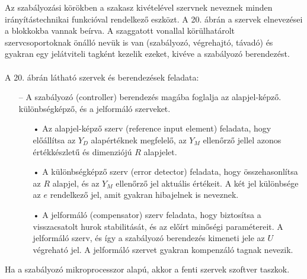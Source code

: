 \documentclass[11pt,a4paper]{article}
\begin{document}
Az szabályozási körökben a szakasz kivételével szervnek neveznek minden
irányítástechnikai funkcióval rendelkező eszközt. A 20. ábrán a szervek elnevezései a
blokkokba vannak beírva. A szaggatott vonallal körülhatárolt szervcsoportoknak önálló
nevük is van (szabályozó, végrehajtó, távadó) és gyakran egy jelátviteli tagként kezelik
ezeket, kivéve a szabályozó berendezést.
\\\\
A 20. ábrán látható szervek és berendezések feladata:
\begin{enumerate}
	\item[--] A szabályozó (controller) berendezés magába foglalja az alapjel-képző. különbségképző,
és a jelformáló szerveket.
	\begin{itemize}
		\item[•]Az alapjel-képző szerv (reference input element) feladata, hogy előállítsa az $Y_D$
alapértéknek megfelelő, az $Y_M$ ellenőrző jellel azonos értékkészletű és dimenziójú $R$ alapjelet.
\item[•]A különbségképző szerv (error detector) feladata, hogy összehasonlítsa az $R$
alapjel, és az $Y_M$ ellenőrző jel aktuális értékeit. A két jel különbsége az $e$ rendelkező
jel, amit gyakran hibajelnek is neveznek.
\item[•]A jelformáló (compensator) szerv feladata, hogy biztosítsa a visszacsatolt hurok
stabilitását, és az előírt minőségi paramétereit. A jelformáló szerv, és így a szabályozó
berendezés kimeneti jele az $U$ végreható jel. A jelformáló szervet gyakran kompenzáló tagnak nevezik.
	\end{itemize}
\end{enumerate}
Ha a szabályozó mikroprocesszor alapú, akkor a fenti szervek szoftver taszkok.
\end{document}
